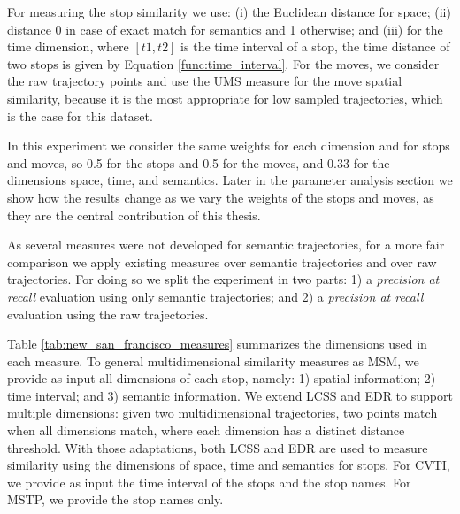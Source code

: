 For measuring the stop similarity we use: (i) the Euclidean distance for space; (ii)  distance 0 in case of exact match for semantics and 1 otherwise; and (iii) for the time dimension, where $[t1, t2]$ is the time interval of a stop, the time distance of two stops is given by  Equation {\ref{func:time_interval}}. For the moves, we consider the raw trajectory points and use the UMS measure for the move spatial similarity, because it is the most appropriate for low sampled trajectories, which is the case for this dataset.

In this experiment we consider the same weights for each dimension and for stops and moves, so 0.5 for the stops and 0.5 for the moves, and 0.33 for the dimensions space, time, and semantics. Later in the parameter analysis section we show how the results change as we vary the weights of the stops and moves, as they are the central contribution of this thesis.

As several measures were not developed for semantic trajectories, for a more fair comparison we apply existing measures over semantic trajectories and over raw trajectories. For doing so we split the experiment in two parts: 1) a \textit{precision at recall} evaluation using only semantic trajectories; and 2) a \textit{precision at recall} evaluation using the raw trajectories.

Table \ref{tab:new_san_francisco_measures} summarizes the dimensions used in each measure. To general multidimensional similarity measures as MSM, we provide as input all dimensions of each stop, namely: 1) spatial information; 2) time interval; and 3) semantic information. We extend LCSS and EDR to support multiple dimensions: given two multidimensional trajectories, two points match when all dimensions match, where each dimension has a distinct distance threshold. With those adaptations, both LCSS and EDR are used to measure similarity using the dimensions of space, time and semantics for stops. For CVTI, we provide as input the time interval of the stops and the stop names. For MSTP, we provide the stop names only.

